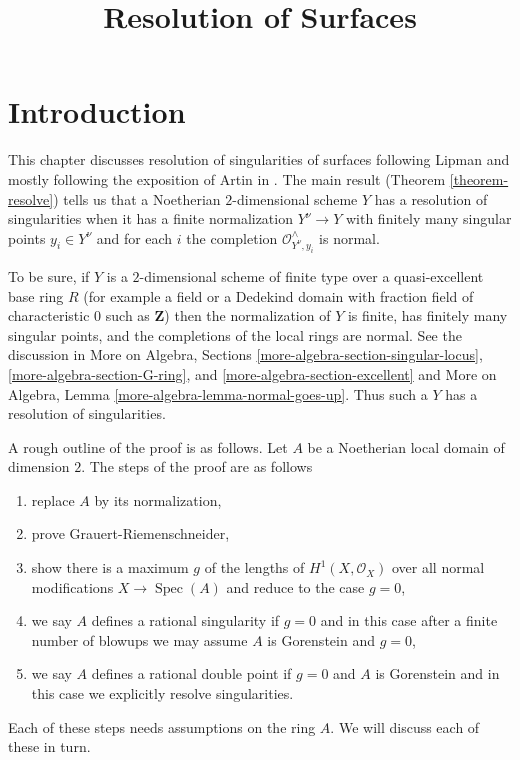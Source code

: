 \documentclass{stacks-project}
\theoremstyle{plain}
\theoremstyle{definition}
\theoremstyle{remark}
\numberwithin{equation}{subsection}
\def\Spec{\mathop{\mathrm{Spec}}}
\begin{document}
\title{Resolution of Surfaces}


\maketitle

\label{section-phantom}

\tableofcontents

\section{Introduction}
\label{section-introduction}

\noindent
This chapter discusses resolution of singularities of surfaces
following Lipman \cite{Lipman} and mostly following the exposition of
Artin in \cite{Artin-Lipman}. The main result
(Theorem \ref{theorem-resolve}) tells us that a Noetherian
$2$-dimensional scheme $Y$ has a resolution of singularities when
it has a finite normalization $Y^\nu \to Y$ with
finitely many singular points $y_i \in Y^\nu$ and for each $i$ the completion
$\mathcal{O}_{Y^\nu, y_i}^\wedge$ is normal.

\medskip\noindent
To be sure, if $Y$ is a $2$-dimensional scheme of finite type over
a quasi-excellent base ring $R$ (for example a field or a
Dedekind domain with fraction field of characteristic $0$
such as $\mathbf{Z}$) then the normalization of $Y$ is finite,
has finitely many singular points, and the completions of the
local rings are normal. See the discussion in
More on Algebra, Sections
\ref{more-algebra-section-singular-locus},
\ref{more-algebra-section-G-ring}, and
\ref{more-algebra-section-excellent}
and
More on Algebra, Lemma \ref{more-algebra-lemma-normal-goes-up}.
Thus such a $Y$ has a resolution of singularities.

\medskip\noindent
A rough outline of the proof is as follows. Let $A$ be a
Noetherian local domain of dimension $2$. The steps of the proof
are as follows
\begin{enumerate}
\item[N] replace $A$ by its normalization,
\item[V] prove Grauert-Riemenschneider,
\item[B] show there is a maximum $g$ of the lengths of
$H^1(X, \mathcal{O}_X)$ over all normal modifications $X \to \Spec(A)$
and reduce to the case $g = 0$,
\item[R] we say $A$ defines a rational singularity if $g = 0$
and in this case after a finite number of
blowups we may assume $A$ is Gorenstein and $g = 0$,
\item[D] we say $A$ defines a rational double point if
$g = 0$ and $A$ is Gorenstein and in this case we
explicitly resolve singularities.
\end{enumerate}
Each of these steps needs assumptions on the ring $A$.
We will discuss each of these in turn.
\end{document}
